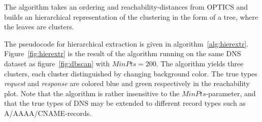 \documentclass[a4paper]{report}
\begin{document}
The algorithm takes an ordering and reachability-distances from OPTICS and
builds an hierarchical representation of the clustering in the form of a tree,
where the leaves are clusters.

The pseudocode for hierarchical extraction is given in 
algorithm~\ref{alg:hierextr}. Figure~\ref{fig:hierextr} is the result of
the algorithm running on the same DNS dataset as figure~\ref{fig:dbscan}
with $MinPts = 200$. The algorithm yields three clusters, each cluster
distinguished by changing background color. The true types \emph{request} and
\emph{response} are colored blue and green respectively in the reachability
plot. Note that the algorithm is rather insensitive to the $MinPts$-parameter,
and that the true types of DNS may be extended to different record types such
as A/AAAA/CNAME-records.
\end{document}
